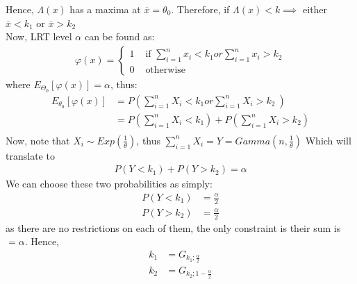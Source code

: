 \documentclass[a4paper]{article}
\begin{document}
Hence, $\Lambda\left( x \right) $ has a maxima at $\overline{x} = \theta_0$.
\newline\newline
Therefore, if $\Lambda\left( x \right) < k \implies$ either $\overline{x} <k_1$ or $\overline{x} > k_2$\\
\newline\newline
Now, LRT level $\alpha$ can be found as:
\begin{equation*}
	\begin{split}
		\varphi\left( x \right)  = \begin{cases}
			1 & \text{ if } \sum_{i=1}^{n} x_i < k_1 or \sum_{i=1}^{n} x_i >k_2\\
			0 & \text{ otherwise} 
		\end{cases}
	\end{split}
\end{equation*}
where $E_{\Theta_0}\left[ \varphi\left( x \right)  \right] = \alpha$, thus:
\begin{equation*}
	\begin{split}
		E_{\theta_0} \left[ \varphi\left( x \right)  \right] &= P\left( \sum_{i=1}^{n} X_i < k_1 or \sum_{i=1}^{n} X_i >k_2\ \right)\\
		&= P\left( \sum_{i=1}^{n} X_i < k_1 \right) + P\left( \sum_{i=1}^{n} X_i > k_2 \right)\\
	\end{split}
\end{equation*}
Now, note that $X_i \sim Exp\left( \frac{1}{\theta} \right) $, thus $\sum_{i=1}^{n} X_i = Y = Gamma\left( n, \frac{1}{\theta} \right) $
\newline\newline
Which will translate to
\begin{equation*}
	\begin{split}
		P\left( Y < k_1 \right) + P\left( Y > k_2  \right) = \alpha		
	\end{split}
\end{equation*}
We can choose these two probabilities as simply:
\begin{equation*}
	\begin{split}
		P\left( Y < k_1 \right) &=  \frac{\alpha}{2}\\
P\left( Y > k_2 \right) &= \frac{\alpha}{2}
	\end{split}
\end{equation*}
as there are no restrictions on each of them, the only constraint is their sum is $=\alpha$.
 \newline\newline
 Hence,
\begin{equation*}
	\begin{split}
		k_1 &=  G_{k_1;\frac{\alpha}{2}}\\
		k_2 &= G_{k_2;1 - \frac{\alpha}{2}}
	\end{split}
\end{equation*}
\end{document}
